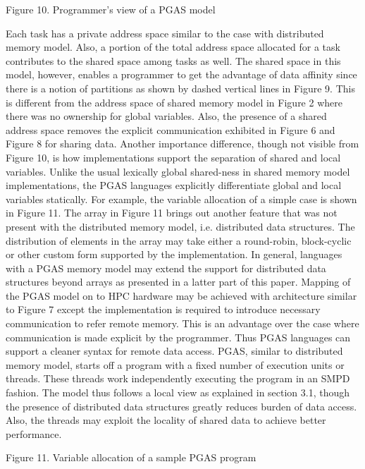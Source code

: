  
Figure 10. Programmer's view of a PGAS model

Each task has a private address space similar to the case with distributed memory model. Also, a portion of the total address space allocated for a task contributes to the shared space among tasks as well. The shared space in this model, however, enables a programmer to get the advantage of data affinity since there is a notion of partitions as shown by dashed vertical lines in Figure 9. This is different from the address space of shared memory model in Figure 2 where there was no ownership for global variables. Also, the presence of a shared address space removes the explicit communication exhibited in Figure 6 and Figure 8 for sharing data. Another importance difference, though not visible from Figure 10, is how implementations support the separation of shared and local variables. Unlike the usual lexically global shared-ness in shared memory model implementations, the PGAS languages explicitly differentiate global and local variables statically. For example, the variable allocation of a simple case is shown in Figure 11.
The array in Figure 11 brings out another feature that was not present with the distributed memory model, i.e. distributed data structures. The distribution of elements in the array may take either a round-robin, block-cyclic or other custom form supported by the implementation. In general, languages with a PGAS memory model may extend the support for distributed data structures beyond arrays as presented in a latter part of this paper. 
Mapping of the PGAS model on to HPC hardware may be achieved with architecture similar to Figure 7 except the implementation is required to introduce necessary communication to refer remote memory. This is an advantage over the case where communication is made explicit by the programmer. Thus PGAS languages can support a cleaner syntax for remote data access.
PGAS, similar to distributed memory model, starts off a program with a fixed number of execution units or threads. These threads work independently executing the program in an SMPD fashion. The model thus follows a local view as explained in section 3.1, though the presence of distributed data structures greatly reduces burden of data access. Also, the threads may exploit the locality of shared data to achieve better performance.
 
Figure 11. Variable allocation of a sample PGAS program


